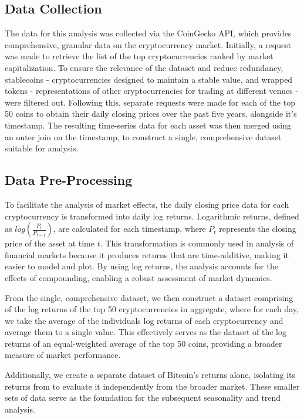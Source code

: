 \documentclass[
]{article}
\begin{document}
\subsection{Data Collection}\label{data-collection}

The data for this analysis was collected via the CoinGecko API, which
provides comprehensive, granular data on the cryptocurrency market.
Initially, a request was made to retrieve the list of the top
cryptocurrencies ranked by market capitalization. To ensure the
relevance of the dataset and reduce redundancy, stablecoins -
cryptocurrencies designed to maintain a stable value, and wrapped tokens
- representations of other cryptocurrencies for trading at different
venues - were filtered out. Following this, separate requests were made
for each of the top 50 coins to obtain their daily closing prices over
the past five years, alongside it's timestamp. The resulting time-series
data for each asset was then merged using an outer join on the
timestamp, to construct a single, comprehensive dataset suitable for
analysis.

\subsection{Data Pre-Processing}\label{data-pre-processing}

To facilitate the analysis of market effects, the daily closing price
data for each cryptocurrency is transformed into daily log returns.
Logarithmic returns, defined as \(log(\frac{P_t}{P_{t-1}})\), are
calculated for each timestamp, where \(P_t\) represents the closing
price of the asset at time \(t\). This transformation is commonly used
in analysis of financial markets because it produces returns that are
time-additive, making it easier to model and plot. By using log returns,
the analysis accounts for the effects of compounding, enabling a robust
assessment of market dynamics.

From the single, comprehensive dataset, we then construct a dataset
comprising of the log returns of the top 50 cryptocurrencies in
aggregate, where for each day, we take the average of the individuals
log returns of each cryptocurrency and average them to a single value.
This effectively serves as the dataset of the log returns of an
equal-weighted average of the top 50 coins, providing a broader measure
of market performance.

Additionally, we create a separate dataset of Bitcoin's returns alone,
isolating its returns from to evaluate it independently from the broader
market. These smaller sets of data serve as the foundation for the
subsequent seasonality and trend analysis.
\end{document}

